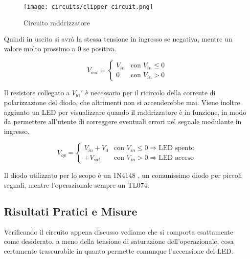 \begin{figure}[H]
    \centering
    \texttt{[image: circuits/clipper\_circuit.png]}
    \caption{Circuito raddrizzatore}
    \label{clipper_circuit}
\end{figure}

Quindi in uscita si avrà la stessa tensione in ingresso se negativa, mentre un valore molto
prossimo a $0$ se positiva.

\begin{equation}\label{clipper_out}
    V_{out} =
    \left\{
    \begin{array}{lr}
        V_{in} & \text{con } V_{in}\le0 \\
        0      & \text{con } V_{in}>0
    \end{array}
    \right.
\end{equation}

Il resistore collegato a $V_{b1}'$ è necessario per il ricircolo della corrente di
polarizzazione del diodo, che altrimenti non si accenderebbe mai. Viene inoltre aggiunto un
LED per visualizzare quando il raddrizzatore è in funzione, in modo da permettere all'utente
di correggere eventuali errori nel segnale modulante in ingresso.

\begin{equation}\label{clipper_op}
    V_{op} =
    \left\{
    \begin{array}{lr}
        V_{in}+V_d & \text{con } V_{in}\le0\Rightarrow \text{LED spento} \\
        +V_{sat}   & \text{con } V_{in}>0\Rightarrow \text{LED acceso}
    \end{array}
    \right.
\end{equation}

Il diodo utilizzato per lo scopo è un 1N4148 \cite{1n4148}, un comunissimo diodo per piccoli
segnali, mentre l'operazionale sempre un TL074.


\subsection*{Risultati Pratici e Misure}


Verificando il circuito appena discusso vediamo che si comporta esattamente come desiderato,
a meno della tensione di saturazione dell'operazionale, cosa certamente trascurabile in quanto
permette comunque l'accensione del LED.

